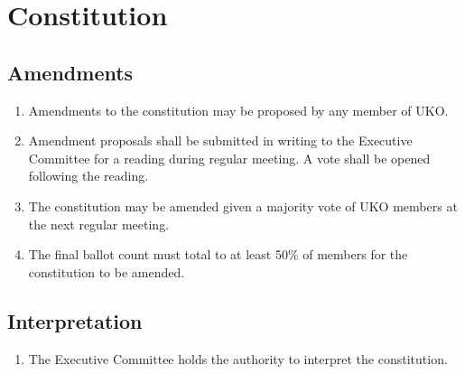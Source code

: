 \documentclass[12pt,executivepaper]{article}
\begin{document}
\section{Constitution}

\subsection{Amendments}
\begin{enumerate}
    \item Amendments to the constitution may be proposed by any member of UKO.
    \item Amendment proposals shall be submitted in writing to the Executive
          Committee for a reading during regular meeting. A vote shall be
          opened following the reading.
    \item The constitution may be amended given a majority vote of UKO members
          at the next regular meeting.
    \item The final ballot count must total to at least 50\% of members for the
          constitution to be amended.
\end{enumerate}

\subsection{Interpretation}
\begin{enumerate}
    \item The Executive Committee holds the authority to interpret the constitution.
\end{enumerate}
\end{document}
